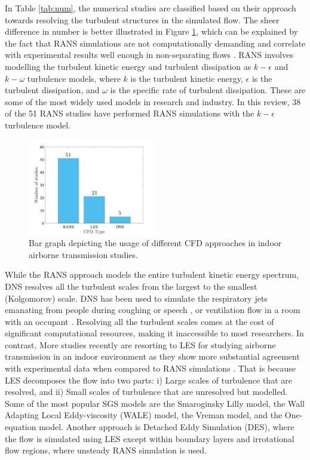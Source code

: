 \documentclass[a4paper,12pt]{elsarticle}
\begin{document}
In Table \ref{tab:num}, the numerical studies are classified based on their approach towards resolving the turbulent structures in the simulated flow. The sheer difference in number is better illustrated in Figure \ref{fig:cfd}, which can be explained by the fact that RANS simulations are not computationally demanding and correlate with experimental results well enough in non-separating flows \cite{wu2023numerical}. RANS involves modelling the turbulent kinetic energy and turbulent dissipation as $k-\epsilon$ and $k-\omega$ turbulence models, where $k$ is the turbulent kinetic energy, $\epsilon$ is the turbulent dissipation, and $\omega$ is the specific rate of turbulent dissipation. These are some of the most widely used models in research and industry. In this review, 38 of the 51 RANS studies have performed RANS simulations with the $k-\epsilon$ turbulence model.

\begin{figure}[ht]
    \centering
    \includegraphics[width=0.5\textwidth]{figures/cfd.jpg}
    \caption{Bar graph depicting the usage of different CFD approaches in indoor airborne transmission studies.}
    \label{fig:cfd}
\end{figure}

While the RANS approach models the entire turbulent kinetic energy spectrum, DNS resolves all the turbulent scales from the largest to the smallest (Kolgomorov) \cite{kolmogorov1941local} scale. DNS has been used to simulate the respiratory jets emanating from people during coughing \cite{rosti2020fluid,diwan2020understanding, chong2021extended} or speech \cite{giri2022colliding, singhal2022virus}, or ventilation flow in a room with an occupant \cite{yerragolam2024effect}. Resolving all the turbulent scales comes at the cost of significant computational resources, making it inaccessible to most researchers. In contrast, More studies recently are resorting to LES for studying airborne transmission in an indoor environment \cite{vuorinen2020modelling,feng2020study,khosronejad2020fluid} as they show more substantial agreement with experimental data when compared to RANS simulations \cite{wu2023numerical}. That is because LES decomposes the flow into two parts: i) Large scales of turbulence that are resolved, and ii) Small scales of turbulence that are unresolved but modelled. Some of the most popular SGS models are the Smaroginsky Lilly model, the Wall Adapting Local Eddy-viscosity (WALE) model, the Vreman model, and the One-equation model. Another approach is Detached Eddy Simulation (DES), where the flow is simulated using LES except within boundary layers and irrotational flow regions, where unsteady RANS simulation is used.
\end{document}
